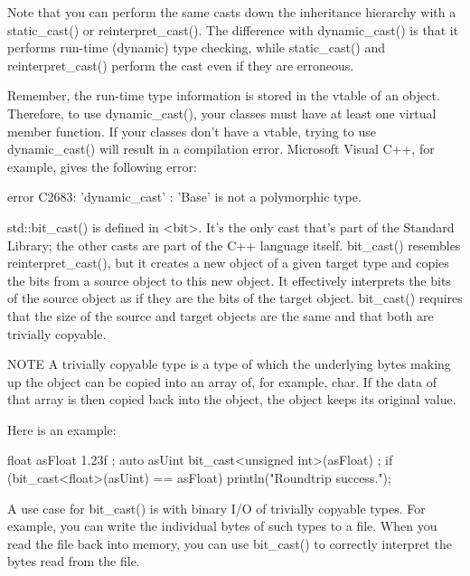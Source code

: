 Note that you can perform the same casts down the inheritance hierarchy with a static\_cast() or reinterpret\_cast(). The difference with dynamic\_cast() is that it performs run-time (dynamic) type checking, while static\_cast() and reinterpret\_cast() perform the cast even if they are erroneous.

Remember, the run-time type information is stored in the vtable of an object. Therefore, to use dynamic\_cast(), your classes must have at least one virtual member function. If your classes don’t have a vtable, trying to use dynamic\_cast() will result in a compilation error. Microsoft Visual C++, for example, gives the following error:

\begin{shell}
error C2683: 'dynamic_cast' : 'Base' is not a polymorphic type.
\end{shell}



std::bit\_cast() is defined in <bit>. It’s the only cast that’s part of the Standard Library; the other casts are part of the C++ language itself. bit\_cast() resembles reinterpret\_cast(), but it creates a new object of a given target type and copies the bits from a source object to this new object. It effectively interprets the bits of the source object as if they are the bits of the target object. bit\_cast() requires that the size of the source and target objects are the same and that both are trivially copyable.

\begin{myNotic}{NOTE}
A trivially copyable type is a type of which the underlying bytes making up the object can be copied into an array of, for example, char. If the data of that array is then copied back into the object, the object keeps its original value.
\end{myNotic}

Here is an example:

\begin{cpp}
float asFloat { 1.23f };
auto asUint { bit_cast<unsigned int>(asFloat) };
if (bit_cast<float>(asUint) == asFloat) { println("Roundtrip success."); }
\end{cpp}

A use case for bit\_cast() is with binary I/O of trivially copyable types. For example, you can write the individual bytes of such types to a file. When you read the file back into memory, you can use bit\_cast() to correctly interpret the bytes read from the file.

